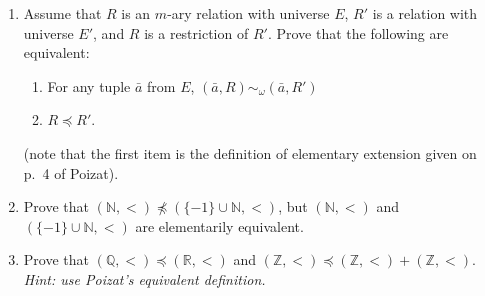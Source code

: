\documentclass{amsart}
\theoremstyle{definition}
\newcommand{\ba}{\bar{a}}
\begin{document}
\begin{enumerate}
  \begin{enumerate}
  \item Assume that $R$ is an $m$-ary relation with universe $E$, $R'$ is a relation with universe $E'$, and $R$ is a restriction of $R'$. Prove that the following are equivalent:
    \begin{enumerate}
    \item For any tuple $\ba$ from $E$, $(\ba, R) \sim_{\omega} (\ba, R')$
    \item $R \preceq R'$.
    \end{enumerate}

    (note that the first item is the definition of elementary extension given on p.~4 of Poizat).
  \item Prove that $(\mathbb{N}, <) \not \preceq (\{-1\} \cup \mathbb{N}, <)$, but $(\mathbb{N}, <)$ and $(\{-1\} \cup \mathbb{N}, <)$ are elementarily equivalent.
  \item Prove that $(\mathbb{Q}, <) \preceq (\mathbb{R}, <)$ and $(\mathbb{Z}, <) \preceq (\mathbb{Z}, <) + (\mathbb{Z}, <)$. \emph{Hint: use Poizat's equivalent definition.}
  \end{enumerate}
\end{enumerate}



\end{document}
